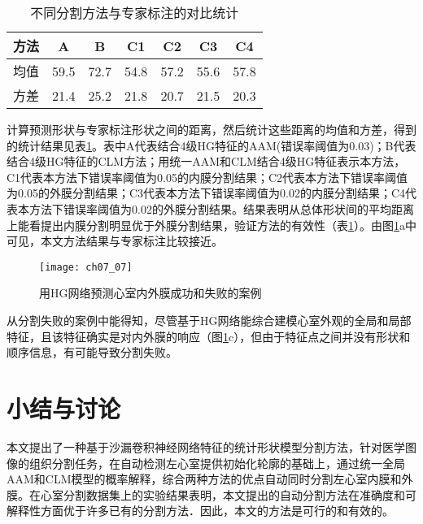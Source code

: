 \begin{table}[!htbp]
    \centering
    \footnotesize%
    \setlength{\tabcolsep}{4pt}%
    \renewcommand{\arraystretch}{1.2}%
    \begin{tabular}{lcccccc}
        \cline{1-7}%
         方法  &A  &B &C1 &C2	&C3	&C4 \\
        \hline
        均值	&59.5	&72.7	&54.8	&57.2	&55.6	&57.8 \\
        \hline
        方差	&21.4	&25.2	&21.8	&20.7	&21.5	&20.3\\
        \hline\hline
    \end{tabular}
    \caption{不同分割方法与专家标注的对比统计}
    \label{tab:ch07_01}
\end{table}

计算预测形状与专家标注形状之间的距离，然后统计这些距离的均值和方差，得到的统计结果见表\ref{tab:ch07_01}。表中A代表结合4级HG特征的AAM(错误率阈值为0.03)；B代表结合4级HG特征的CLM方法；用统一AAM和CLM结合4级HG特征表示本方法，C1代表本方法下错误率阈值为0.05的内膜分割结果；C2代表本方法下错误率阈值为0.05的外膜分割结果；C3代表本方法下错误率阈值为0.02的内膜分割结果；C4代表本方法下错误率阈值为0.02的外膜分割结果。结果表明从总体形状间的平均距离上能看提出内膜分割明显优于外膜分割结果，验证方法的有效性（表\ref{tab:ch07_01}）。由图\ref{fig:ch07_07}a中可见，本文方法结果与专家标注比较接近。
\begin{figure}[!htbp]
\centering
\texttt{[image: ch07\_07]}
\caption{用HG网络预测心室内外膜成功和失败的案例}
\label{fig:ch07_07}
\end{figure}   

从分割失败的案例中能得知，尽管基于HG网络能综合建模心室外观的全局和局部特征，且该特征确实是对内外膜的响应（图\ref{fig:ch07_07}c），但由于特征点之间并没有形状和顺序信息，有可能导致分割失败。

\section{小结与讨论}

本文提出了一种基于沙漏卷积神经网络特征的统计形状模型分割方法，针对医学图像的组织分割任务，在自动检测左心室提供初始化轮廓的基础上，通过统一全局AAM和CLM模型的概率解释，综合两种方法的优点自动同时分割左心室内膜和外膜。在心室分割数据集上的实验结果表明，本文提出的自动分割方法在准确度和可解释性方面优于许多已有的分割方法．因此，本文的方法是可行的和有效的。

